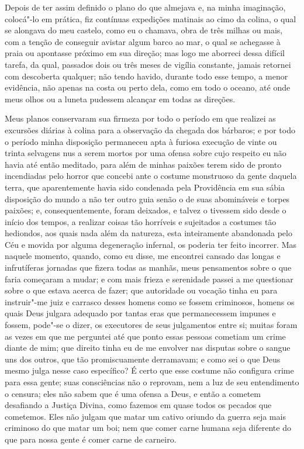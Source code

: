 Depois de ter assim definido o plano do que almejava e, na minha
imaginação, colocá"-lo em prática, fiz contínuas expedições matinais ao
cimo da colina, o qual se alongava do meu castelo, como eu o chamava,
obra de três milhas ou mais, com a tenção de conseguir avistar algum
barco ao mar, o qual se achegasse à praia ou apontasse próximo em sua
direção; mas logo me aborreci dessa difícil tarefa, da qual, passados
dois ou três meses de vigília constante, jamais retornei com descoberta
qualquer; não tendo havido, durante todo esse tempo, a menor evidência,
não apenas na costa ou perto dela, como em todo o oceano, até onde meus
olhos ou a luneta pudessem alcançar em todas as direções.

Meus planos conservaram sua firmeza por todo o período em que realizei
as excursões diárias à colina para a observação da chegada dos bárbaros;
e por todo o período minha disposição permaneceu apta à furiosa execução
de vinte ou trinta selvagens nus a serem mortos por uma ofensa sobre
cujo respeito eu não havia até então meditado, para além de minhas
paixões terem sido de pronto incendiadas pelo horror que concebi ante o
costume monstruoso da gente daquela terra, que aparentemente havia sido
condenada pela Providência em sua sábia disposição do mundo a não ter
outro guia senão o de suas abomináveis e torpes paixões; e,
consequentemente, foram deixados, e talvez o tivessem sido desde o
início dos tempos, a realizar coisas tão horríveis e sujeitados a
costumes tão hediondos, aos quais nada além da natureza, esta
inteiramente abandonada pelo Céu e movida por alguma degeneração
infernal, os poderia ter feito incorrer. Mas naquele momento, quando,
como eu disse, me encontrei cansado das longas e infrutíferas jornadas
que fizera todas as manhãs, meus pensamentos sobre o que faria começaram
a mudar; e com mais frieza e serenidade passei a me questionar sobre o
que estava acerca de fazer; que autoridade ou vocação tinha eu para
instruir"-me juiz e carrasco desses homens como se fossem criminosos,
homens os quais Deus julgara adequado por tantas eras que permanecessem
impunes e fossem, pode"-se o dizer, os executores de seus julgamentos
entre si; muitas foram as vezes em que me perguntei até que ponto essas
pessoas cometiam um crime diante de mim; que direito tinha eu de me
envolver nas disputas sobre o sangue uns dos outros, que tão
promiscuamente derramavam; e como sei o que Deus mesmo julga nesse caso
específico? É certo que esse costume não configura crime para essa
gente; suas consciências não o reprovam, nem a luz de seu entendimento o
censura; eles não sabem que é uma ofensa a Deus, e então a cometem
desafiando a Justiça Divina, como fazemos em quase todos os pecados que
cometemos. Eles não julgam que matar um cativo oriundo da guerra seja
mais criminoso do que matar um boi; nem que comer carne humana seja
diferente do que para nossa gente é comer carne de carneiro.


